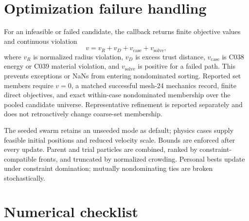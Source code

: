 \documentclass[11pt]{article}
\begin{document}
\section{Optimization failure handling}

For an infeasible or failed candidate, the callback returns finite objective values and continuous violation
\begin{equation}
v=v_R+v_D+v_{\mathrm{case}}+v_{\mathrm{solve}},
\end{equation}
where $v_R$ is normalized radius violation, $v_D$ is excess trust distance, $v_{\mathrm{case}}$ is C038 energy or C039 material violation, and $v_{\mathrm{solve}}$ is positive for a failed path. This prevents exceptions or NaNs from entering nondominated sorting. Reported set members require $v=0$, a matched successful mesh-24 mechanics record, finite direct objectives, and exact within-case nondominated membership over the pooled candidate universe. Representative refinement is reported separately and does not retroactively change coarse-set membership.

The seeded swarm retains an unseeded mode as default; physics cases supply feasible initial positions and reduced velocity scale. Bounds are enforced after every update. Parent and trial particles are combined, ranked by constraint-compatible fronts, and truncated by normalized crowding. Personal bests update under constraint domination; mutually nondominating ties are broken stochastically.

\section{Numerical checklist}
\end{document}
